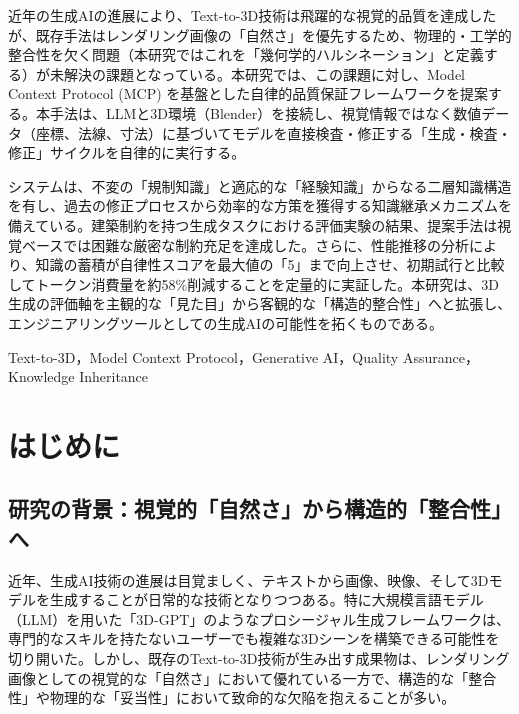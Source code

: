 \documentclass[dvipdfmx, a4paper, 9pt]{deimj}
\begin{document}
\pagestyle{empty}

\begin{jabstract}
近年の生成AIの進展により、Text-to-3D技術は飛躍的な視覚的品質を達成したが、既存手法はレンダリング画像の「自然さ」を優先するため、物理的・工学的整合性を欠く問題（本研究ではこれを「幾何学的ハルシネーション」と定義する）が未解決の課題となっている。本研究では、この課題に対し、Model Context Protocol (MCP) を基盤とした自律的品質保証フレームワークを提案する。本手法は、LLMと3D環境（Blender）を接続し、視覚情報ではなく数値データ（座標、法線、寸法）に基づいてモデルを直接検査・修正する「生成・検査・修正」サイクルを自律的に実行する。

システムは、不変の「規制知識」と適応的な「経験知識」からなる二層知識構造を有し、過去の修正プロセスから効率的な方策を獲得する知識継承メカニズムを備えている。建築制約を持つ生成タスクにおける評価実験の結果、提案手法は視覚ベースでは困難な厳密な制約充足を達成した。さらに、性能推移の分析により、知識の蓄積が自律性スコアを最大値の「5」まで向上させ、初期試行と比較してトークン消費量を約58\%削減することを定量的に実証した。本研究は、3D生成の評価軸を主観的な「見た目」から客観的な「構造的整合性」へと拡張し、エンジニアリングツールとしての生成AIの可能性を拓くものである。
\end{jabstract}

\begin{jkeyword}
Text-to-3D，Model Context Protocol，Generative AI，Quality Assurance，Knowledge Inheritance
\end{jkeyword}

\maketitle

\section{はじめに}

\subsection{研究の背景：視覚的「自然さ」から構造的「整合性」へ}

近年、生成AI技術の進展は目覚ましく、テキストから画像、映像、そして3Dモデルを生成することが日常的な技術となりつつある。特に大規模言語モデル（LLM）を用いた「3D-GPT」\cite{sun20233dgpt}のようなプロシージャル生成フレームワークは、専門的なスキルを持たないユーザーでも複雑な3Dシーンを構築できる可能性を切り開いた。しかし、既存のText-to-3D技術が生み出す成果物は、レンダリング画像としての視覚的な「自然さ」において優れている一方で、構造的な「整合性」や物理的な「妥当性」において致命的な欠陥を抱えることが多い。
\end{document}
